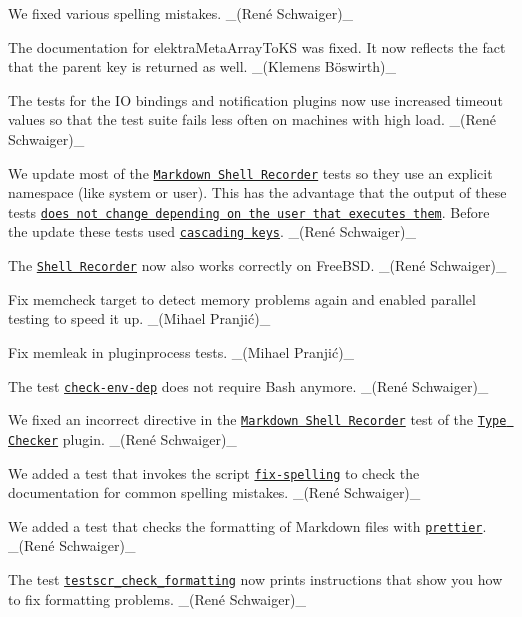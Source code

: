 \begin{DoxyItemize}
\item We fixed various spelling mistakes. \+\_\+(René Schwaiger)\+\_\+
\item The documentation for {\ttfamily elektra\+Meta\+Array\+To\+KS} was fixed. It now reflects the fact that the parent key is returned as well. \+\_\+(Klemens Böswirth)\+\_\+
\end{DoxyItemize}


\begin{DoxyItemize}
\item The tests for the IO bindings and notification plugins now use increased timeout values so that the test suite fails less often on machines with high load. \+\_\+(René Schwaiger)\+\_\+
\item We update most of the \href{https://master.libelektra.org/tests/shell/shell_recorder/tutorial_wrapper}{\tt Markdown Shell Recorder} tests so they use an explicit namespace (like {\ttfamily system} or {\ttfamily user}). This has the advantage that the output of these tests \href{https://issues.libelektra.org/1773}{\tt does not change depending on the user that executes them}. Before the update these tests used \href{https://www.libelektra.org/tutorials/namespaces}{\tt cascading keys}. \+\_\+(René Schwaiger)\+\_\+
\item The \href{https://master.libelektra.org/tests/shell/shell_recorder}{\tt Shell Recorder} now also works correctly on Free\+B\+SD. \+\_\+(René Schwaiger)\+\_\+
\item Fix memcheck target to detect memory problems again and enabled parallel testing to speed it up. \+\_\+(Mihael Pranjić)\+\_\+
\item Fix memleak in pluginprocess tests. \+\_\+(Mihael Pranjić)\+\_\+
\item The test \href{https://master.libelektra.org/scripts/check-env-dep}{\tt {\ttfamily check-\/env-\/dep}} does not require Bash anymore. \+\_\+(René Schwaiger)\+\_\+
\item We fixed an incorrect directive in the \href{https://master.libelektra.org/tests/shell/shell_recorder/tutorial_wrapper}{\tt Markdown Shell Recorder} test of the \href{https://www.libelektra.org/plugins/typechecker}{\tt Type Checker} plugin. \+\_\+(René Schwaiger)\+\_\+
\item We added a test that invokes the script \href{http://master.libelektra.org/scripts/dev/fix-spelling}{\tt {\ttfamily fix-\/spelling}} to check the documentation for common spelling mistakes. \+\_\+(René Schwaiger)\+\_\+
\item We added a test that checks the formatting of Markdown files with \href{https://prettier.io}{\tt {\ttfamily prettier}}. \+\_\+(René Schwaiger)\+\_\+
\item The test \href{https://master.libelektra.org/tests/shell/check_formatting.sh}{\tt {\ttfamily testscr\+\_\+check\+\_\+formatting}} now prints instructions that show you how to fix formatting problems. \+\_\+(René Schwaiger)\+\_\+
\end{DoxyItemize}


